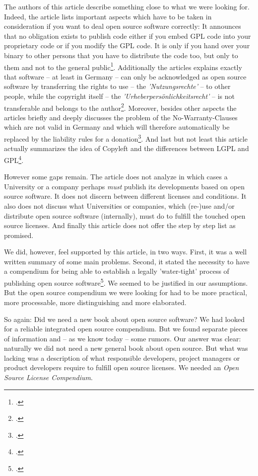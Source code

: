 The authors of this article describe something close to what we were looking
for. Indeed, the article lists important aspects which have to be taken in
consideration if you want to deal open source software correctly: It announces
that no obligation exists to publish code either if you embed GPL code into your
proprietary code or if you modify the GPL code. It is only if you hand over your
binary to other persons that you have to distribute the code too, but only to
them and not to the general public\footcite[cf.][170 and 181]{BreGlaGra2008a}.
Additionally the articles explains exactly that software -- at least in Germany --
can only be acknowledged as open source software by transferring the rights to
use -- the \emph{'Nutzungsrechte'} -- to other people, while the copyright itself
-- the \emph{'Urheberpersönlichkeitsrecht'} -- is not transferable and belongs to
the author\footcite[cf.][173]{BreGlaGra2008a}. Moreover, besides other aspects
the articles briefly and deeply discusses the problem of the No-Warranty-Clauses
which are not valid in Germany and which will therefore automatically be
replaced by the liability rules for a
donation\footcite[cf.][177]{BreGlaGra2008a}. And last but not least this article
actually summarizes the idea of Copyleft and the differences between LGPL and
GPL\footcite[cf.][181]{BreGlaGra2008a}.

However some gaps remain. The article does not analyze in which cases a
University or a company perhaps \emph{must} publish its developments based
on open source software. It does not discern between different licenses
and conditions. It also does not discuss what Universities or companies,
which (re-)use and/or distribute open source software (internally), must do to
fulfill the touched open source licenses. And finally this article
does not offer the step by step list as promised.

We did, however, feel supported by this article, in two ways. First, it was a
well written summary of some main problems. Second, it stated the necessity to
have a compendium for being able to establish a legally 'water-tight' process of
publishing open source software\footcite[cf.][186]{BreGlaGra2008a}. We
seemed to be justified in our assumptions. But the open source compendium we
were looking for had to be more practical, more processable, more distinguishing
and more elaborated.

So again: Did we need a new book about open source software? We had looked for a
reliable integrated open source compendium. But we found separate pieces of
information and -- as we know today -- some rumors. Our answer was clear:
naturally we did not need a new general book about open source. But what was
lacking was a description of what responsible developers, project managers or
product developers require to fulfill open source licenses. We needed an
\textit{Open Source License Compendium}.

